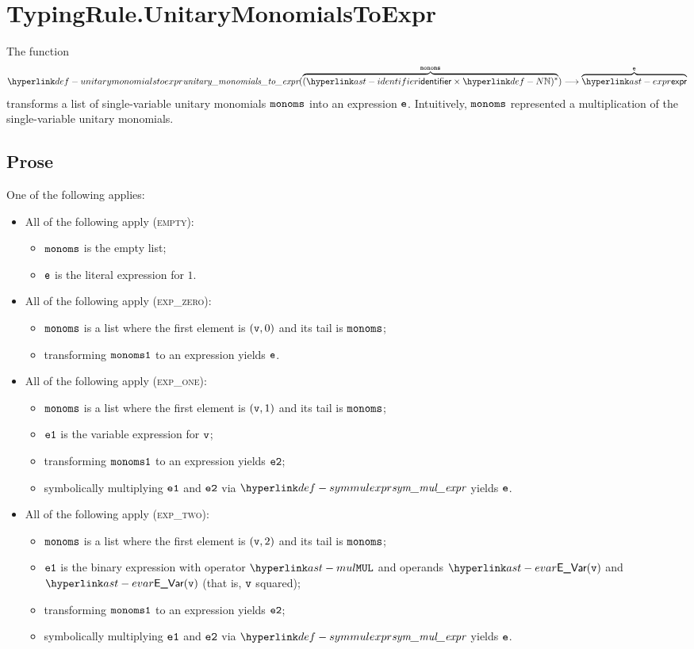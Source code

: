 \section{TypingRule.UnitaryMonomialsToExpr \label{sec:TypingRule.UnitaryMonomialsToExpr}}
\hypertarget{def-unitarymonomialstoexpr}{}
The function
\[
\unitarymonomialstoexpr(\overname{(\identifier\times\N)^*}{\monoms}) \aslto \overname{\expr}{\ve}
\]
transforms a list of single-variable unitary monomials $\texttt{monoms}$ into an expression $\texttt{e}$.
Intuitively, $\texttt{monoms}$ represented a multiplication of the single-variable unitary monomials.

\subsection{Prose}
One of the following applies:
\begin{itemize}
  \item All of the following apply (\textsc{empty}):
  \begin{itemize}
    \item $\texttt{monoms}$ is the empty list;
    \item $\texttt{e}$ is the literal expression for $1$.
  \end{itemize}

  \item All of the following apply (\textsc{exp\_zero}):
  \begin{itemize}
    \item $\texttt{monoms}$ is a list where the first element is $(\texttt{v}, 0)$ and its tail is $\texttt{monoms}$;
    \item transforming $\texttt{monoms1}$ to an expression yields $\texttt{e}$.
  \end{itemize}

  \item All of the following apply (\textsc{exp\_one}):
  \begin{itemize}
    \item $\texttt{monoms}$ is a list where the first element is $(\texttt{v}, 1)$ and its tail is $\texttt{monoms}$;
    \item $\texttt{e1}$ is the variable expression for $\texttt{v}$;
    \item transforming $\texttt{monoms1}$ to an expression yields $\texttt{e2}$;
    \item symbolically multiplying $\texttt{e1}$ and $\texttt{e2}$ via $\symmulexpr$ yields $\texttt{e}$.
  \end{itemize}

  \item All of the following apply (\textsc{exp\_two}):
  \begin{itemize}
    \item $\texttt{monoms}$ is a list where the first element is $(\texttt{v}, 2)$ and its tail is $\texttt{monoms}$;
    \item $\texttt{e1}$ is the binary expression with operator $\MUL$ and operands $\EVar(\vv)$ and $\EVar(\vv)$
          (that is, $\texttt{v}$ squared);
    \item transforming $\texttt{monoms1}$ to an expression yields $\texttt{e2}$;
    \item symbolically multiplying $\texttt{e1}$ and $\texttt{e2}$ via $\symmulexpr$ yields $\texttt{e}$.
  \end{itemize}


\end{itemize}
